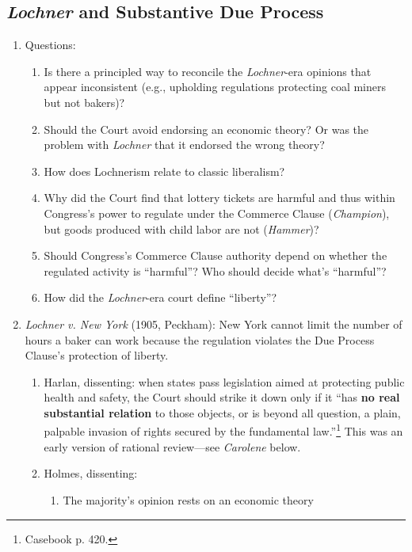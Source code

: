 \subsection{\emph{Lochner} and Substantive Due Process}

\begin{enumerate}
    \item Questions:
    \begin{enumerate}
        \item Is there a principled way to reconcile the \emph{Lochner}-era 
        opinions that appear inconsistent (e.g., upholding regulations 
        protecting coal miners but not bakers)?
        \item Should the Court avoid endorsing an economic theory? Or was the 
        problem with \emph{Lochner} that it endorsed the wrong theory?
        \item How does Lochnerism relate to classic liberalism?
        \item Why did the Court find that lottery tickets are harmful and thus 
        within Congress's power to regulate under the Commerce Clause 
        (\emph{Champion}), but goods produced with child labor are not 
        (\emph{Hammer})?
        \item Should Congress's Commerce Clause authority depend on whether 
        the regulated activity is ``harmful''? Who should decide what's 
        ``harmful''?
        \item How did the \emph{Lochner}-era court define ``liberty''?
    \end{enumerate}
    \item \emph{Lochner v. New York} (1905, Peckham): New York cannot limit 
    the number of hours a baker can work because the regulation violates the 
    Due Process Clause's protection of liberty.
    \begin{enumerate}
        \item Harlan, dissenting: when states pass legislation aimed at 
        protecting public health and safety, the Court should strike it down 
        only if it ``has \textbf{no real substantial relation} to those 
        objects, or is beyond all question, a plain, palpable invasion of 
        rights secured by the fundamental law.''\footnote{Casebook p. 420.} 
        This was an early version of rational review---see \emph{Carolene} 
        below.
        \item Holmes, dissenting:
        \begin{enumerate}
            \item The majority's opinion rests on an economic theory 

\end{enumerate}
\end{enumerate}
\end{enumerate}
